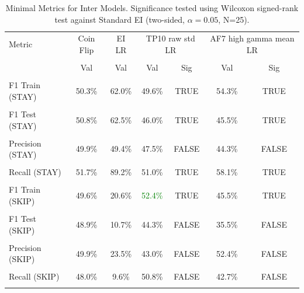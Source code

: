 \begin{table}[H]
\centering
\begin{tabular}{lcccccc}
\hline
Metric & Coin Flip & EI LR & \multicolumn{2}{c}{TP10 raw std LR} & \multicolumn{2}{c}{AF7 high gamma mean LR} \\\\
 & Val & Val & Val & Sig & Val & Sig \\\\
\hline
F1 Train (STAY) & 50.3\% & 62.0\% & 49.6\% & TRUE & 54.3\% & TRUE \\\\
F1 Test (STAY) & 50.8\% & 62.5\% & 46.0\% & TRUE & 45.5\% & TRUE \\\\
Precision (STAY) & 49.9\% & 49.4\% & 47.5\% & FALSE & 44.3\% & FALSE \\\\
Recall (STAY) & 51.7\% & 89.2\% & 51.0\% & TRUE & 58.1\% & TRUE \\\\
F1 Train (SKIP) & 49.6\% & 20.6\% & \textcolor{green}{52.4\%} & TRUE & 45.5\% & TRUE \\\\
F1 Test (SKIP) & 48.9\% & 10.7\% & 44.3\% & FALSE & 35.5\% & FALSE \\\\
Precision (SKIP) & 49.9\% & 23.5\% & 43.0\% & FALSE & 52.4\% & FALSE \\\\
Recall (SKIP) & 48.0\% & 9.6\% & 50.8\% & FALSE & 42.7\% & FALSE \\\\
\hline
\end{tabular}
\caption{Minimal Metrics for Inter Models. Significance tested using Wilcoxon signed-rank test against Standard EI (two-sided, $\alpha=0.05$, N=25).}
\label{tab:metrics_inter_ablation}
\end{table}
